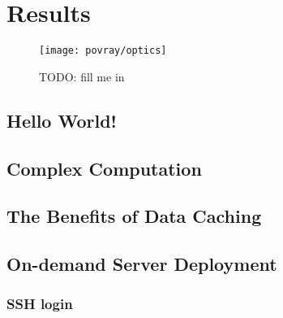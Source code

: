 
\chapter{Results}
\label{cha:results}

\begin{figure}[h]
  \begin{center}
    \texttt{[image: povray/optics]}
  \end{center}
  \caption[An advanced POV-Ray picture]{TODO: fill me in}
  \label{fig:pov-optics}
\end{figure}

\section{Hello World!}
\label{sec:hello-world}

\section{Complex Computation}
\label{sec:complex-example}

\section{The Benefits of Data Caching}
\label{sec:data-caching}

\section{On-demand Server Deployment}
\label{sec:on-demand-server-deployment}

\subsection{SSH login}


